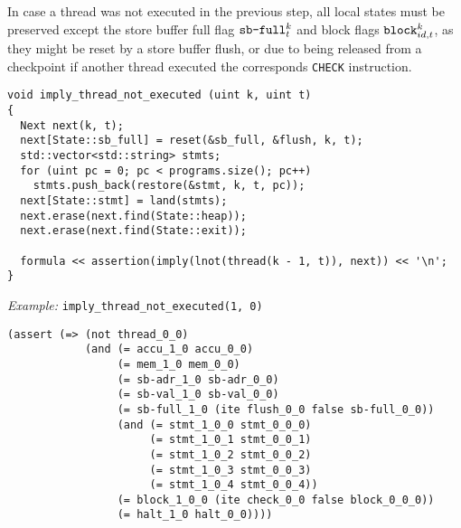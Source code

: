 \noindent
In case a thread was not executed in the previous step, all local states must be preserved except the store buffer full flag $\texttt{sb-full}^k_t$ and block flags $\texttt{block}^k_{id, t}$, as they might be reset by a store buffer flush, or due to being released from a checkpoint if another thread executed the corresponds \lstinline[language={[concubine]Assembler}]{CHECK} instruction.

\begin{lstlisting}[style=c++]
void imply_thread_not_executed (uint k, uint t)
{
  Next next(k, t);
  next[State::sb_full] = reset(&sb_full, &flush, k, t);
  std::vector<std::string> stmts;
  for (uint pc = 0; pc < programs.size(); pc++)
    stmts.push_back(restore(&stmt, k, t, pc));
  next[State::stmt] = land(stmts);
  next.erase(next.find(State::heap));
  next.erase(next.find(State::exit));

  formula << assertion(imply(lnot(thread(k - 1, t)), next)) << '\n';
}
\end{lstlisting}

\noindent
\emph{Example:} \lstinline[style=c++]{imply_thread_not_executed(1, 0)}

\begin{lstlisting}[language=SMTLib]
(assert (=> (not thread_0_0)
            (and (= accu_1_0 accu_0_0)
                 (= mem_1_0 mem_0_0)
                 (= sb-adr_1_0 sb-adr_0_0)
                 (= sb-val_1_0 sb-val_0_0)
                 (= sb-full_1_0 (ite flush_0_0 false sb-full_0_0))
                 (and (= stmt_1_0_0 stmt_0_0_0)
                      (= stmt_1_0_1 stmt_0_0_1)
                      (= stmt_1_0_2 stmt_0_0_2)
                      (= stmt_1_0_3 stmt_0_0_3)
                      (= stmt_1_0_4 stmt_0_0_4))
                 (= block_1_0_0 (ite check_0_0 false block_0_0_0))
                 (= halt_1_0 halt_0_0))))
\end{lstlisting}


